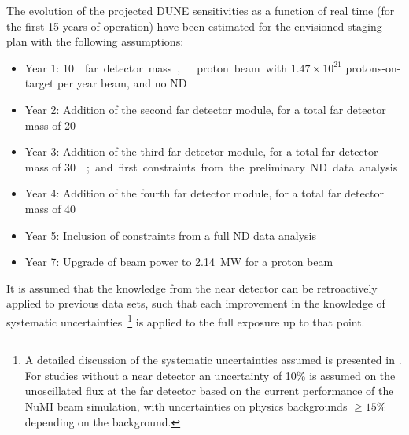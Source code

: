 
The evolution of the projected DUNE sensitivities as a function of real time
(for the first \num{15} years of operation) have been estimated for the envisioned staging plan
with the following assumptions:
\begin{itemize}
\item Year 1: \SI{10}\kt{} far detector mass,  
  proton beam with $1.47 \times 10^{21}$ protons-on-target per year
  beam, and no ND
\item Year 2: Addition of the second  far detector module, for a total far detector mass of
  \SI{20}\kt
\item Year 3: Addition of the third  far detector module, for a total far detector mass of
  \SI{30}\kt; and first constraints from the preliminary ND data analysis
\item Year 4: Addition of the fourth  far detector module, for a total far detector mass of
  \SI{40}\kt
\item Year 5: Inclusion of constraints from a full ND data analysis
 \item Year 7: Upgrade of beam power to \SI{2.14}{\MW} for a 
  proton beam
\end{itemize}

It is assumed that the knowledge from the near detector can be
retroactively applied to previous data sets, such that each
improvement in the knowledge of systematic uncertainties~\footnote{A
  detailed discussion of the systematic uncertainties assumed is presented in
  \volphys. For studies without a near detector an uncertainty of 10\%
  is assumed on the unoscillated flux at the far detector based on the
  current performance of the NuMI beam simulation, with uncertainties
  on physics backgrounds $\geq 15\%$ depending on the background.} is
applied to the full exposure up to that point.



%

